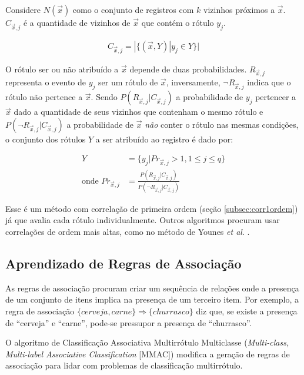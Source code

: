 \documentclass[runningheads,a4paper]{llncs}
\begin{document}
Considere $N(\vec{x})$ como o conjunto de registros com $k$ vizinhos próximos a $\vec{x}$. $C_{\vec{x}, j}$ é a quantidade de vizinhos de $\vec{x}$ que contém o rótulo $y_j$.

\begin{align*}
C_{\vec{x}, j} = |\{ (\vec{x}, Y) | y_j \in Y \}|
\end{align*}

O rótulo ser ou não atribuído a $\vec{x}$ depende de duas probabilidades. $R_{\vec{x},j}$ representa o evento de $y_j$ ser um rótulo de $\vec{x}$, inversamente, $\neg R_{\vec{x}, j}$ indica que o rótulo não pertence a $\vec{x}$. Sendo $P(R_{\vec{x}, j} | C_{\vec{x}, j})$ a probabilidade de $y_j$ pertencer a $\vec{x}$ dado a quantidade de seus vizinhos que contenham o mesmo rótulo e $P(\neg R_{\vec{x}, j} | C_{\vec{x}, j})$ a probabilidade de $\vec{x}$ \textit{não} conter o rótulo nas mesmas condições, o conjunto dos rótulos $Y$ a ser atribuído ao registro é dado por:

\begin{align*}
Y &= \{ y_j | Pr_{\vec{x}, j} > 1, 1 \leq j \leq q \} \\
\text{onde } Pr_{\vec{x}, j} &= \frac{P( R_{\vec{x}, j} | C_{\vec{x}, j})}{P(\neg R_{\vec{x}, j} | C_{\vec{x}, j})}
\end{align*}

Esse é um método com correlação de primeira ordem (seção \ref{subsec:corr1ordem}) já que avalia cada rótulo individualmente. Outros algoritmos procuram usar correlações de ordem mais altas, como no método de Younes \textit{et al}. \cite{Younes2011-sf}.

\subsection{Aprendizado de Regras de Associação}

As regras de associação procuram criar um sequência de relações onde a presença de um conjunto de itens implica na presença de um terceiro item. Por exemplo, a regra de associação $\{ cerveja, carne \} \Rightarrow \{ churrasco \}$ diz que, se existe a presença de \enquote{cerveja} e \enquote{carne}, pode-se pressupor a presença de \enquote{churrasco}.

O algoritmo de Classificação Associativa Multirrótulo Multiclasse (\textit{Multi-class, Multi-label Associative Classification} [MMAC]) \cite{Thabtah2004-vz} modifica a geração de regras de associação para lidar com problemas de classificação multirrótulo.
\end{document}
